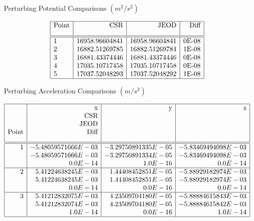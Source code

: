 \begin{description}
\begin{table}[htbp]\caption{Perturbing Potential Comparisons $(m^2/s^2)$}
\label{tab:pot_compare}
\smallskip
\[ \begin{array}{| l | r | r | r |}\hline
\mbox{Point} & \mbox{CSR} & \mbox{JEOD} & \mbox{Diff}
\\*[0.3cm]\hline \hline
1 & 16958.96604841 & 16958.96604841 & $0E-08$ \\
2 & 16882.51269785 & 16882.51269784 & $1E-08$ \\
3 & 16881.43374446 & 16881.43374446 & $0E-08$ \\
4 & 17035.10717458 & 17035.10717458 & $0E-08$ \\
5 & 17037.52048293 & 17037.52048292 & $1E-08$ \\
\hline
\end{array} \]
\end{table}

\begin{table}\caption{Perturbing Acceleration Comparisons $(m/s^2)$} \label{tab:accel_compare}
\smallskip
\[ \begin{array}{| r | r | r | r |}\hline
\mbox{     } & \mbox{x}        & \mbox{y} & \mbox{z} \\
\mbox{     } & \mbox{CSR}      & \mbox{}  & \mbox{} \\
\mbox{     } & \mbox{JEOD}     & \mbox{}  & \mbox{} \\
\mbox{Point} & \mbox{Diff}     & \mbox{}  & \mbox{} 
\\*[0.3cm]\hline \hline

1 & -5.48059571666E-03 & -3.29750891335E-05 & -5.83469494098E-03 \\
  & -5.48059571666E-03 & -3.29750891334E-05 & -5.83469494098E-03 \\
  &            0.0E-14 &            1.0E-16 &            0.0E-14 \\
\hline

2 &  5.41224638245E-03 &  1.44408452851E-05 & -5.88929182974E-03 \\
  &  5.41224638245E-03 &  1.44408452851E-05 & -5.88929182974E-03 \\
  &            0.0E-14 &            0.0E-16 &            0.0E-14 \\
\hline

3 &  5.41212832075E-03 &  4.23509704180E-05 & -5.88884615843E-03 \\
  &  5.41212832074E-03 &  4.23509704180E-05 & -5.88884615842E-03 \\
  &            1.0E-14 &            0.0E-16 &            1.0E-14 \\
\hline


\end{array}\]
\end{table}
\end{description}

